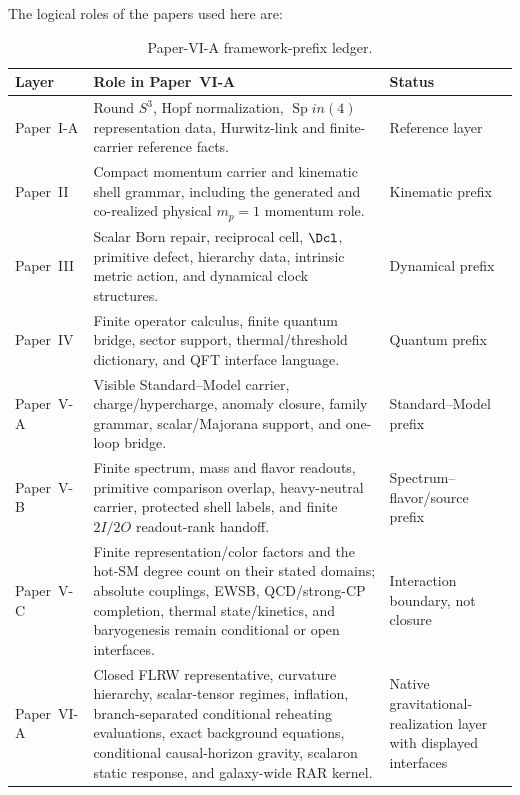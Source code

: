 \documentclass[12pt,a4paper]{article}
\begin{document}
The logical roles of the papers used here are:
\begin{table}[H]
\centering
\caption[Paper-VI-A framework-prefix ledger]{Paper-VI-A framework-prefix ledger.}
\label{p8:tab:framework-prefix-ledger}
\footnotesize
\renewcommand{\arraystretch}{1.15}
\begin{tabularx}{\textwidth}{@{}p{}X p{}@{}}
\toprule
\textbf{Layer} & \textbf{Role in Paper~VI-A} & \textbf{Status} \\
\midrule
Paper~I-A & Round \(S^3\), Hopf normalization, \(\operatorname{Sp}in(4)\) representation data, Hurwitz-link and finite-carrier reference facts. & Reference layer \\
Paper~II & Compact momentum carrier and kinematic shell grammar, including the generated and co-realized physical \(m_p=1\) momentum role. & Kinematic prefix \\
Paper~III & Scalar Born repair, reciprocal cell, \(\Dcl\), primitive defect, hierarchy data, intrinsic metric action, and dynamical clock structures. & Dynamical prefix \\
Paper~IV & Finite operator calculus, finite quantum bridge, sector support, thermal/threshold dictionary, and QFT interface language. & Quantum prefix \\
Paper~V-A & Visible Standard--Model carrier, charge/hypercharge, anomaly closure, family grammar, scalar/Majorana support, and one-loop bridge. & Standard--Model prefix \\
Paper~V-B & Finite spectrum, mass and flavor readouts, primitive comparison overlap, heavy-neutral carrier, protected shell labels, and finite \(2I/2O\) readout-rank handoff. & Spectrum--flavor/source prefix \\
Paper~V-C & Finite representation/color factors and the hot-SM degree count on their stated domains; absolute couplings, EWSB, QCD/strong-CP completion, thermal state/kinetics, and baryogenesis remain conditional or open interfaces. & Interaction boundary, not closure \\
Paper~VI-A & Closed FLRW representative, curvature hierarchy, scalar-tensor regimes, inflation, branch-separated conditional reheating evaluations, exact background equations, conditional causal-horizon gravity, scalaron static response, and galaxy-wide RAR kernel. & Native gravitational-realization layer with displayed interfaces \\

\end{tabularx}
\end{table}
\end{document}

